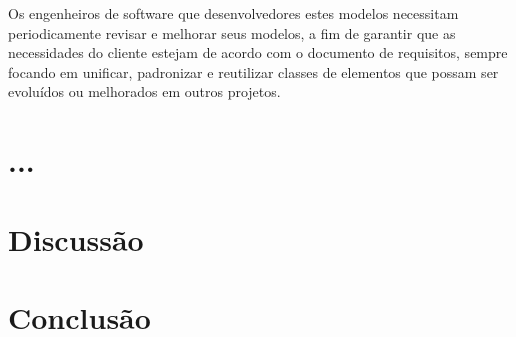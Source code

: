 \documentclass[12pt]{article}
\begin{document}
Os engenheiros de software que desenvolvedores estes modelos necessitam periodicamente revisar e melhorar seus modelos, a fim de garantir que as necessidades do cliente estejam de acordo com o documento de requisitos, sempre focando em unificar, padronizar e reutilizar classes de elementos que possam ser evoluídos ou melhorados em outros projetos.

\section{...}%
\section{Discussão}
\section{Conclusão}
\end{document}
